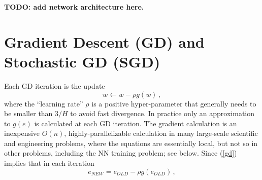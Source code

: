 \documentclass[11pt]{article}
\begin{document}
{\bf TODO: add network architecture here.}

\section{Gradient Descent (GD) and Stochastic GD (SGD)}
\label{sec:gd}

Each GD iteration is the update
\begin{equation}
	w \longleftarrow w - \rho g\left(w\right)\,,
	\label{gd}
\end{equation}
where the ``learning rate'' $\rho$ is a positive hyper-parameter that generally needs to be smaller than $3 / H$ to avoid fast divergence. In practice only an approximation to $g(e)$ is calculated at each GD iteration. The gradient calculation is an inexpensive $O(n)$, highly-parallelizable calculation in many large-scale scientific and engineering problems, where the equations are essentially local, but not so in other problems, including the NN training problem; see below. Since (\ref{gd}) implies that in each iteration
$$
	e_{NEW} = e_{OLD} - \rho g\left(e_{OLD}\right)\,,
$$
\end{document}

